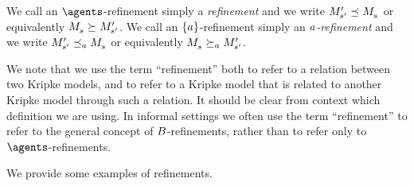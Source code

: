 We call an $\agents$-refinement simply a {\em refinement} and we write $\kPModelP{\kStateSP} \refines \kPModel{\kStateS}$ or equivalently $\kPModel{\kStateS} \simulates \kPModelP{\kStateSP}$.
We call an $\{a\}$-refinement simply an {\em $a$-refinement} and we write $\kPModelP{\kStateSP} \refinesA \kPModel{\kStateS}$ or equivalently $\kPModel{\kStateS} \simulatesA \kPModelP{\kStateSP}$.

We note that we use the term ``refinement'' both to refer to a relation between two Kripke models, and to refer to a Kripke model that is related to another Kripke model through such a relation.
It should be clear from context which definition we are using.
In informal settings we often use the term ``refinement'' to refer to the general concept of $B$-refinements, rather than to refer only to $\agents$-refinements.

We provide some examples of refinements.

